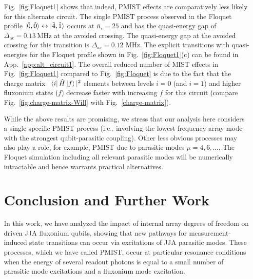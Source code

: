\documentclass[%
reprint,
superscriptaddress,
 amsmath,amssymb,
 aps,
 prx,
longbibliography,
floatfix,
]{revtex4-2}
\begin{document}
Fig.~\ref{fig:Floquet1} shows that indeed, PMIST effects are comparatively less likely for this alternate circuit. The single PMIST process observed in the Floquet profile $\ket{\tilde{0},\tilde{0}}\leftrightarrow\ket{\tilde{4},\tilde{1}}$ occurs at $\bar n_\textrm{r}=25$ and has the quasi-energy gap of $\Delta_\textrm{ac}=0.13 \ \mathrm{MHz}$ at the avoided crossing. The quasi-energy gap at the avoided crossing for this transition is $\Delta_\textrm{ac}=0.12$ MHz. The explicit transitions with quasi-energies for the Floquet profile shown in Fig.~\ref{fig:Floquet1}(c) can be found in App.~\ref{app:alt_circuit1}. The overall reduced number of MIST effects in Fig.~\ref{fig:Floquet1} compared to Fig.~\ref{fig:Floquet} is due to the fact that the charge matrix $|\bra{i}\hat H\ket{f}|^2$ elements between levels $i=0$ (and $i=1$) and higher fluxonium states ($f$) decrease faster with increasing $f$ for this circuit (compare Fig.~\ref{fig:charge-matrix-Will} with Fig.~\ref{charge-matrix}).

While the above results are promising, we stress that our analysis here considers a single specific PMIST process (i.e., involving the lowest-frequency array mode with the strongest qubit-parasitic coupling). Other less obvious processes may also play a role, for example, PMIST due to parasitic modes $\mu=4,6,\ldots$. The Floquet simulation including all relevant parasitic modes will be numerically intractable and hence warrants practical alternatives.

\section{Conclusion and Further Work}\label{sec:conclusion}
In this work, we have analyzed the impact of internal array degrees of freedom on driven JJA fluxonium qubits, showing that new pathways for measurement-induced state transitions can occur via excitations of JJA parasitic modes. These processes, which we have called PMIST, occur at particular resonance conditions when the energy of several readout photons is equal to a small number of parasitic mode excitations and a fluxonium mode excitation.
\end{document}
